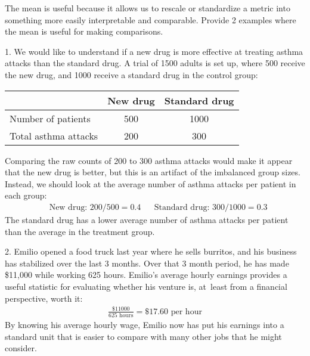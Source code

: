\begin{examplewrap}
\begin{nexample}{The mean is useful because it allows us to
    rescale or standardize a metric into something more easily
    interpretable and comparable.
    Provide 2 examples where the mean
    is useful for making comparisons.}

  1. We would like to understand if a new drug is more
  effective at treating asthma attacks than the standard drug.
  A trial of 1500 adults is set up, where 500 receive the new
  drug, and 1000 receive a standard drug in the control
  group:\vspace{-2mm}
  \begin{center}
  \begin{tabular}{l cc}
  &           New drug & Standard drug \\
  \hline
  Number of patients   & 500 & 1000 \\
  Total asthma attacks & 200 & 300 \\
  \hline
  \end{tabular}
  \end{center}
  Comparing the raw counts of 200 to 300 asthma attacks
  would make it appear that the new drug is better,
  but this is an artifact of the imbalanced group sizes.
  Instead, we should look at the average number of asthma
  attacks per patient in each group:
  \begin{align*}
  & \text{New drug: } 200 / 500 = 0.4 %
  && \text{Standard drug: } 300 / 1000 = 0.3
  \end{align*}
  The standard drug has a lower average number of asthma
  attacks per patient than the average in the treatment group.

  2. Emilio opened a food truck last year where he sells burritos,
  and his business has stabilized over the last 3 months.
  Over that 3 month period, he has made \$11,000 while
  working 625 hours.
  Emilio's average hourly earnings provides
  a useful statistic for evaluating whether his venture is,
  at~least from a financial perspective, worth it:
  \begin{align*}
  \frac{\$11000}{625\text{ hours}} = \$17.60\text{ per hour}
  \end{align*}
  By knowing his average hourly wage,
  Emilio now has put his earnings into a standard unit that
  is easier to compare with many other jobs that he might
  consider.
\end{nexample}
\end{examplewrap}

